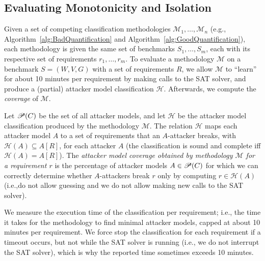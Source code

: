 \subsection{Evaluating Monotonicity and Isolation}
Given a set of competing classification methodologies $\mathcal{M}_1,\ldots, \mathcal{M}_n$ (e.g., Algorithm~\ref{alg:BadQuantification} and Algorithm~\ref{alg:GoodQuantification}), each methodology is given the same set of benchmarks $S_1,\ldots, S_m$, each with its respective set of requirements $r_1, \ldots, r_m$. To evaluate a methodology $\mathcal{M}$ on a benchmark $S=(W,V,G)$ with a set of requirements $R$, we allow $\mathcal{M}$ to ``learn'' for about 10 minutes per requirement by making calls to the SAT solver, and produce a (partial) attacker model classification $\mathcal{H}$.  Afterwards, we compute the \emph{coverage} of $\mathcal{M}$.

\begin{definition}[Coverage]
Let ${{\mathscr{P}}\!\left({C}\right)}$ be the set of all attacker models, and let $\mathcal{H}$ be the attacker model classification produced by the methodology $\mathcal{M}$. The relation $\mathcal{H}$ maps each attacker model $A$ to a set of requirements that an $A$-attacker breaks, with $\mathcal{H}(A)\subseteq A[R]$, for each attacker $A$ (the classification is sound and complete iff $\mathcal{H}(A)= A[R]$). The \emph{attacker model coverage obtained by methodology $\mathcal{M}$ for a requirement $r$} is the percentage of attacker models $A\in{{\mathscr{P}}\!\left({C}\right)}$ for which we can correctly determine whether $A$-attackers break $r$ only by computing $r\in \mathcal{H}(A)$ (i.e.,do not allow guessing and we do not allow making new calls to the SAT solver).
\end{definition}

We measure the execution time of the classification per requirement; i.e., the time it takes for the methodology to find minimal attacker models, capped at about 10 minutes per requirement. We force stop the classification for each requirement if a timeout occurs, but not while the SAT solver is running (i.e., we do not interrupt the SAT solver), which is why the reported time sometimes  exceeds 10 minutes.

